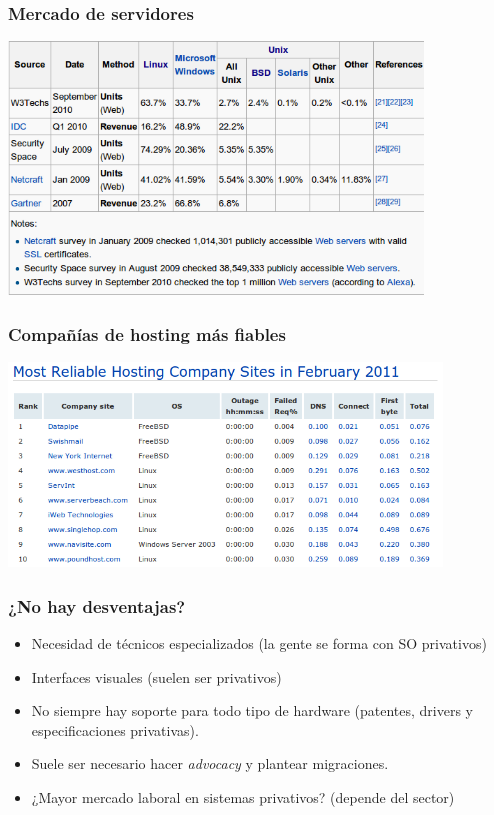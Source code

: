\documentclass{beamer}
\begin{document}
\begin{frame}
\frametitle{Mercado de servidores}

\begin{center}
\includegraphics[width=11.0cm]{figs/servers-market.png}
\end{center}

\end{frame}


\begin{frame}
\frametitle{Compañías de hosting más fiables}

\begin{center}
\includegraphics[width=11.5cm]{figs/netcraft.png}
\end{center}

\end{frame}


\begin{frame}
\frametitle{¿No hay desventajas?}

\pause

\begin{itemize}
\item Necesidad de técnicos especializados (la gente se forma con SO privativos)
\item Interfaces visuales (suelen ser privativos)
\item No siempre hay soporte para todo tipo de hardware (patentes, drivers y especificaciones privativas).
\item Suele ser necesario hacer \textit{advocacy} y plantear migraciones.
\item ¿Mayor mercado laboral en sistemas privativos? (depende del sector)
\end{itemize}
\end{frame}
\end{document}
